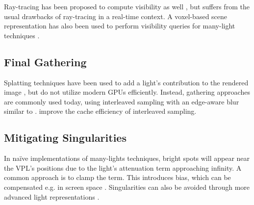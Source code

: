 Ray-tracing has been proposed to compute visibility as well \citep[e.\,g.][]{segovia2006bidirectional}, but suffers from the usual drawbacks of ray-tracing in a real-time context. A voxel-based scene representation has also been used to perform visibility queries for many-light techniques \citep{sun2015manylightsSVO}.


\subsection{Final Gathering}
\label{sec:manyLightsFinalGathering}

Splatting techniques have been used to add a light's contribution to the rendered image \citep{dachsbacher2006splatting, Nichols:2009:splatting}, but do not utilize modern GPUs efficiently. Instead, gathering approaches are commonly used today, using interleaved sampling \citep{Keller:2001:InterleavedSampling} with an edge-aware blur similar to \citep{laine2007incremental}. \cite{segovia2006non} improve the cache efficiency of interleaved sampling.


\subsection{Mitigating Singularities}
 In naïve implementations of many-lights techniques, bright spots will appear near the VPL’s positions due to the light’s attenuation term approaching infinity. A common approach is to clamp the term. This introduces bias, which can be compensated e.g. in screen space \citep{novak2011screen}. Singularities can also be avoided through more advanced light representations \citep{tokuyoshi2015vsgl}.



\cleardoublepage
